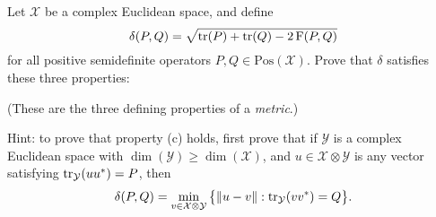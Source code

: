 \documentclass[boxes,pages,color=SeaGreen]{homework}
\newcommand{\X}{\mathcal{X}}
\newcommand{\Y}{\mathcal{Y}}
\newcommand{\Fid}{\operatorname{F}}
\newcommand{\Pos}{\mathrm{Pos}}
\begin{document}
\begin{problem}
Let $\X$ be a complex Euclidean space, and define
\[
    \delta(P,Q) = \sqrt{\tr(P) + \tr(Q) - 2 \Fid(P,Q)}
\]
for all positive semidefinite operators $P,Q\in\Pos(\X)$.
Prove that $\delta$ satisfies these three properties:
(These are the three defining properties of a \emph{metric}.)

Hint: to prove that property (c) holds, first prove that if
$\Y$ is a complex Euclidean space with $\dim(\Y)\geq\dim(\X)$,
and $u\in\X\otimes\Y$ is any vector satisfying $\tr_{\Y}(u u^{\ast}) = P$,
then
\[
    \delta(P,Q) = \min_{v\in\X\otimes\Y}\qty\big{\norm{u - v} : \tr_{\Y}(v v^*) = Q}.
\]
\end{problem}
\end{document}
